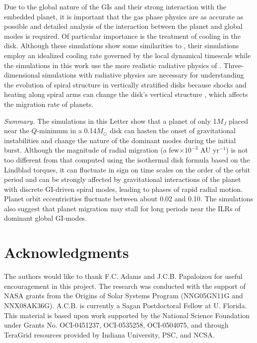 \documentclass[12pt,manuscript,authoryear]{aastex}
\begin{document}
Due to the global nature of the GIs and their strong interaction with the embedded planet, it is important that the gas
phase physics are as accurate as possible and detailed analysis of the interaction between the planet and global modes
is required. Of particular importance is the treatment of cooling in the disk. Although these simulations show some
similarities to \citet{baruteau2011}, their simulations employ an idealized cooling rate governed by the local dynamical
timescale while the simulations in this work use the more realistic radiative physics of
\citet{boley2007b}. Three-dimensional simulations with radiative physics are necessary for understanding the evolution
of spiral structure in vertically stratified disks because shocks and heating along spiral arms can change the disk's
vertical structure \citep[e.g.][]{boley2006a}, which affects the migration rate of planets.

{\it Summary.} The simulations in this Letter show that a planet of only 1$M_J$ placed near the $Q$-minimum in a
0.14$M_{\odot}$ disk can hasten the onset of gravitational instabilities and change the nature of the dominant modes
during the initial burst. Although the magnitude of radial migration (a few$\times10^{-3}$ AU yr$^{-1}$) is not too
different from that computed using the \citet{tanaka2002} isothermal disk formula based on the Lindblad torques, it can
fluctuate in sign on time scales on the order of the orbit period and can be strongly affected by gravitational
interactions of the planet with discrete GI-driven spiral modes, leading to phases of rapid radial motion. Planet orbit
eccentricities fluctuate between about 0.02 and 0.10. The simulations also suggest that planet migration may stall for
long periods near the ILRs of dominant global GI-modes.

\section{Acknowledgments}

The authors would like to thank F.C. Adams and J.C.B. Papaloizou for useful encouragement in this project. The research
was conducted with the support of NASA grants from the Origins of Solar Systems Program (NNG05GN11G and
NNX08AK36G). A.C.B. is currently a Sagan Postdoctoral Fellow at U. Florida. This material is based upon work supported
by the National Science Foundation under Grants No. OCI-0451237, OCI-0535258, OCI-0504075, and through TeraGrid resources provided by Indiana University, PSC, and NCSA.
\end{document}
